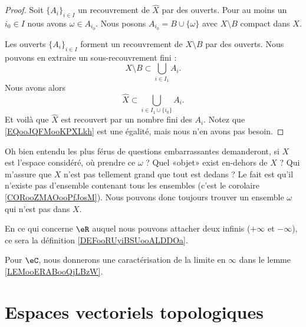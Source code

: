 \begin{proof}
    Soit \( \{ A_i \}_{i\in I}\) un recouvrement de \( \hat X\) par des ouverts. Pour au moins un \( i_0\in I\) nous avons \( \omega\in A_{i_0}\). Nous posons \( A_{i_0}=B\cup\{ \omega \}\) avec \( X\setminus B\) compact dans \( X\).

    Les ouverts \( \{ A_i \}_{i\in I}\) forment un recouvrement de \( X\setminus B\) par des ouverts. Nous pouvons en extraire un sous-recouvrement fini :
    \begin{equation}
        X\setminus B\subset \bigcup_{i\in I_1}A_i.
    \end{equation}
    Nous avons alors
    \begin{equation}        \label{EQooJQFMooKPXLkh}
        \hat X\subset \bigcup_{i\in I_1\cup\{ i_0 \}}A_i.
    \end{equation}
    Et voilà que \( \hat X\) est recouvert par un nombre fini des \( A_i\). Notez que \eqref{EQooJQFMooKPXLkh} est une égalité, mais nous n'en avons pas besoin.
\end{proof}

\begin{normaltext}
    Oh bien entendu les plus férus de questions embarrassantes demanderont, si \( X\) est l'espace considéré, où prendre ce \( \omega\) ? Quel «objet» exist en-dehors de \( X\) ? Qui m'assure que \( X\) n'est pas tellement grand que tout est dedans ? Le fait est qu'il n'existe pas d'ensemble contenant tous les ensembles (c'est le corolaire \ref{CORooZMAOooPfJosM}). Nous pouvons donc toujours trouver un ensemble \( \omega\) qui n'est pas dans \( X\).
\end{normaltext}

En ce qui concerne \( \eR\) auquel nous pouvons attacher deux infinis (\( +\infty\) et \( -\infty\)), ce sera la définition \ref{DEFooRUyiBSUooALDDOa}.

Pour \( \eC\), nous donnerons une caractérisation de la limite en \( \infty\) dans le lemme \ref{LEMooERABooQjLBzW}.

\section{Espaces vectoriels topologiques}

